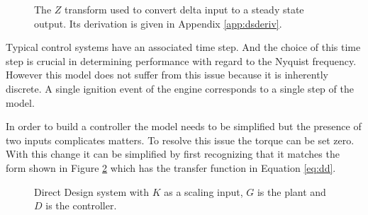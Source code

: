 \documentclass{article}
\begin{document}
\begin{figure}[!htbp]

\begin{center}
\end{center}

\caption{The $Z$ transform used to convert delta input to a steady
state output.
Its derivation is given in Appendix \ref{app:dsderiv}.}
\label{fig:dstf}

\end{figure}

Typical control systems have an associated time step.
And the choice of this time step is crucial in determining performance
with regard to the Nyquist frequency.
However this model does not suffer from this issue because it is
inherently discrete.
A single ignition event of the engine corresponds to a single
step of the model.


In order to build a controller the model needs to be simplified
but the presence of two inputs complicates matters.
To resolve this issue the torque can be set zero.
With this change it can be simplified by first recognizing that
it matches the form shown in Figure \ref{fig:dd} which
has the transfer function in Equation \ref{eq:dd}.

\begin{figure}[h!]

\begin{center}
\end{center}

\caption{Direct Design system with $K$ as a scaling input, $G$ is
the plant and $D$ is the controller.}
\label{fig:dd}
\end{figure}
\end{document}
